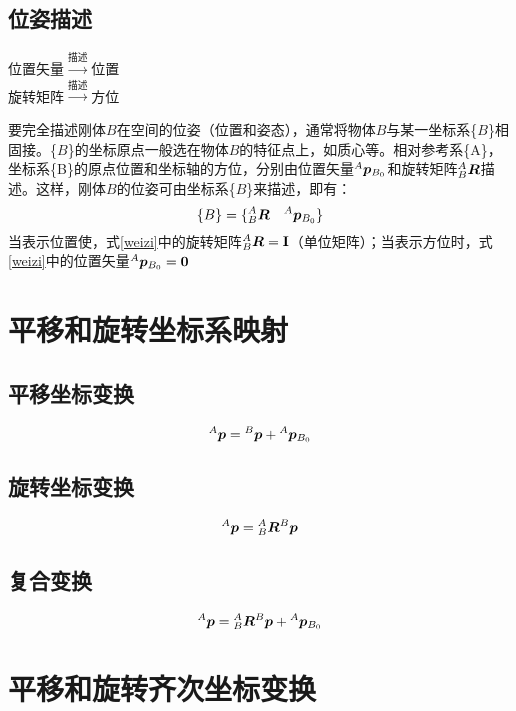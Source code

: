 \subsection{位姿描述}
\begin{center}
位置矢量$\xrightarrow{描述}$位置\\
旋转矩阵$\xrightarrow{描述}$方位
\end{center}
\par 要完全描述刚体$B$在空间的位姿（位置和姿态），通常将物体$B$与某一坐标系\{$B$\}相固接。\{$B$\}的坐标原点一般选在物体$B$的特征点上，如质心等。相对参考系\{A\}，坐标系\{B\}的原点位置和坐标轴的方位，分别由位置矢量$\djb{p}{A}{B_0}$和旋转矩阵$\zb{R}{A}{B}$描述。这样，刚体$B$的位姿可由坐标系\{$B$\}来描述，即有：
\begin{equation}
\{B\}=\{\zb{R}{A}{B} \quad \djb{p}{A}{B_0} \}\label{weizi}
\end{equation}
当表示位置使，式\eqref{weizi}中的旋转矩阵$\zb{R}{A}{B}=\mathbf{I}$（单位矩阵）；当表示方位时，式\eqref{weizi}中的位置矢量$\djb{p}{A}{B_0}=\mathbf{0}$
\section{平移和旋转坐标系映射}
\subsection{平移坐标变换}
\begin{equation}
\zsb{p}{A}=\zsb{p}{B}+\djb{p}{A}{B_0}
\end{equation}
\subsection{旋转坐标变换}
\begin{equation}
\zsb{p}{A}=\zb{R}{A}{B}\zsb{p}{B}
\end{equation}
\subsection{复合变换}
\begin{equation}
\zsb{p}{A}=\zb{R}{A}{B}\zsb{p}{B}+\djb{p}{A}{B_0}
\end{equation}
\section{平移和旋转齐次坐标变换}
